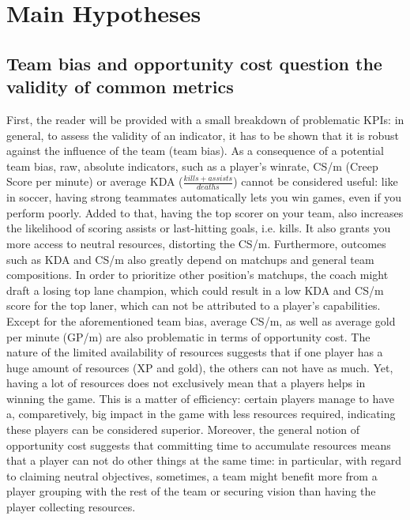 \documentclass{article}
\begin{document}
\section{Main Hypotheses}
\subsection{Team bias and opportunity cost question the validity of common metrics}
First, the reader will be provided with a small breakdown of problematic KPIs: 
in general, to assess the validity of an indicator, it has to be shown that it is robust against the influence of the team (team bias).
As a consequence of a potential team bias, raw, absolute indicators, such as a player's winrate, CS/m (Creep Score per minute) or average KDA ($\frac{kills + assists}{deaths}$) cannot be considered useful: like in soccer, having strong teammates automatically lets you win games, even if you perform poorly. Added to that, having the top scorer on your team, also increases the likelihood of scoring assists or last-hitting goals, i.e. kills. It also grants you more access to neutral resources, distorting the CS/m. Furthermore, outcomes such as KDA and CS/m also greatly depend on matchups and general team compositions. In order to prioritize other position's matchups, the coach might draft a losing top lane champion, which could result in a low KDA and CS/m score for the top laner, which can not be attributed to a player's capabilities. \newline
Except for the aforementioned team bias, average CS/m, as well as average gold per minute (GP/m) are also problematic in terms of opportunity cost. The nature of the limited availability of resources suggests that if one player has a huge amount of resources (XP and gold), the others can not have as much. Yet, having a lot of resources does not exclusively mean that a players helps in winning the game.  This is a matter of efficiency: certain players manage to have a, comparetively, big impact in the game with less resources required, indicating these players can be considered superior. Moreover, the general notion of opportunity cost suggests that committing time to accumulate resources means that a player can not do other things at the same time: in particular, with regard to claiming neutral objectives, sometimes, a team might benefit more from a player grouping with the rest of the team or securing vision than having the player collecting resources. 
\end{document}
